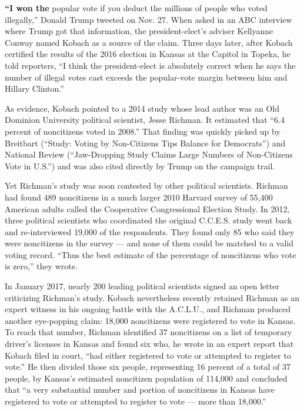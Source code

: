 \textbf{``I won the} popular vote if you deduct the millions of people
who voted illegally,'' Donald Trump tweeted on Nov. 27. When asked in an
ABC interview where Trump got that information, the president-elect's
adviser Kellyanne Conway named Kobach as a source of the claim. Three
days later, after Kobach certified the results of the 2016 election in
Kansas at the Capitol in Topeka, he told reporters, ``I think the
president-elect is absolutely correct when he says the number of illegal
votes cast exceeds the popular-vote margin between him and Hillary
Clinton.''

As evidence, Kobach pointed to a 2014 study whose lead author was an Old
Dominion University political scientist, Jesse Richman. It estimated
that ``6.4 percent of noncitizens voted in 2008.'' That finding was
quickly picked up by Breitbart (``Study: Voting by Non-Citizens Tips
Balance for Democrats'') and National Review (``Jaw-Dropping Study
Claims Large Numbers of Non-Citizens Vote in U.S.'') and was also cited
directly by Trump on the campaign trail.

Yet Richman's study was soon contested by other political scientists.
Richman had found 489 noncitizens in a much larger 2010 Harvard survey
of 55,400 American adults called the Cooperative Congressional Election
Study. In 2012, three political scientists who coordinated the original
C.C.E.S. study went back and re-interviewed 19,000 of the respondents.
They found only 85 who said they were noncitizens in the survey --- and
none of them could be matched to a valid voting record. ``Thus the best
estimate of the percentage of noncitizens who vote is zero,'' they
wrote.

In January 2017, nearly 200 leading political scientists signed an open
letter criticizing Richman's study. Kobach nevertheless recently
retained Richman as an expert witness in his ongoing battle with the
A.C.L.U., and Richman produced another eye-popping claim: 18,000
noncitizens were registered to vote in Kansas. To reach that number,
Richman identified 37 noncitizens on a list of temporary driver's
licenses in Kansas and found six who, he wrote in an expert report that
Kobach filed in court, ``had either registered to vote or attempted to
register to vote.'' He then divided those six people, representing 16
percent of a total of 37 people, by Kansas's estimated noncitizen
population of 114,000 and concluded that ``a very substantial number and
portion of noncitizens in Kansas have registered to vote or attempted to
register to vote --- more than 18,000.''

